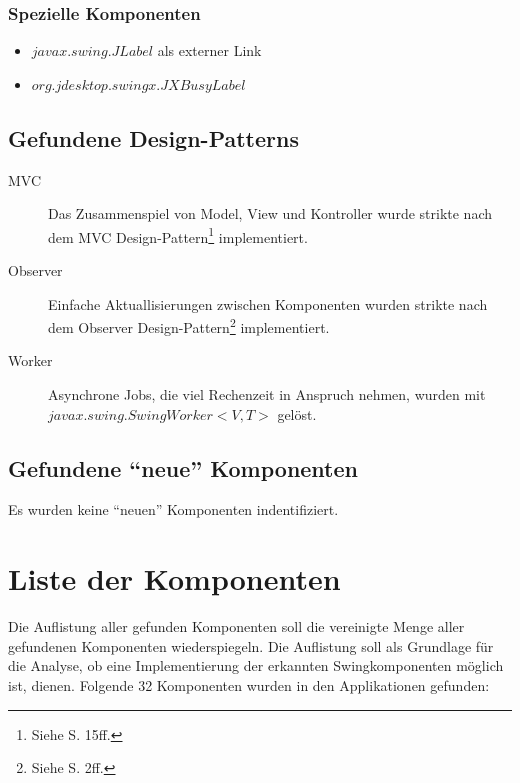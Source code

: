   \subsubsection{Spezielle Komponenten}
    
  \begin{itemize}
    \item \(javax.swing.JLabel\) als externer Link
    \item \(org.jdesktop.swingx.JXBusyLabel\)
  \end{itemize}
  
  \subsection{Gefundene Design-Patterns} 
  
  \begin{description}
    \item[MVC]
    Das Zusammenspiel von Model, View und Kontroller wurde strikte nach dem
    MVC Design-Pattern\footnote{Siehe \cite{GUIDesignPatterns} S. 15ff.}
    implementiert.
    
    \item[Observer]
    Einfache Aktuallisierungen zwischen Komponenten wurden strikte nach dem
    Observer Design-Pattern\footnote{Siehe \cite{GUIDesignPatterns} S. 2ff.}
    implementiert.
    
    \item[Worker]
    Asynchrone Jobs, die viel Rechenzeit in Anspruch nehmen, wurden mit\\
    \(javax.swing.SwingWorker<V,T>\) gelöst.
  \end{description}
  
  \subsection{Gefundene ``neue'' Komponenten}
  
  Es wurden keine ``neuen'' Komponenten indentifiziert.
  
  \section{Liste der Komponenten}
  
  Die Auflistung aller gefunden Komponenten soll die vereinigte Menge aller
  gefundenen Komponenten wiederspiegeln. Die Auflistung soll als Grundlage für
  die Analyse, ob eine Implementierung der erkannten Swingkomponenten möglich
  ist, dienen. Folgende 32 Komponenten wurden in den Applikationen gefunden:
  
